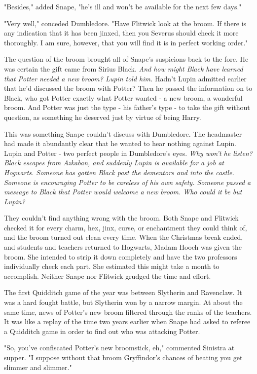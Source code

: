 \documentclass[a4paper,11pt]{article}
\begin{document}
"Besides," added Snape, "he's ill and won't be available for the next few days."

"Very well," conceded Dumbledore. "Have Flitwick look at the broom. If there is any indication that it has been jinxed, then you Severus should check it more thoroughly. I am sure, however, that you will find it is in perfect working order."

The question of the broom brought all of Snape's suspicions back to the fore. He was certain the gift came from Sirius Black. \emph{And how might Black have learned that Potter needed a new broom? Lupin told him.} Hadn't Lupin admitted earlier that he'd discussed the broom with Potter? Then he passed the information on to Black, who got Potter exactly what Potter wanted - a new broom, a wonderful broom. And Potter was just the type - his father's type - to take the gift without question, as something he deserved just by virtue of being Harry.

This was something Snape couldn't discuss with Dumbledore. The headmaster had made it abundantly clear that he wanted to hear nothing against Lupin. Lupin and Potter - two perfect people in Dumbledore's eyes. \emph{Why won't he listen? Black escapes from Azkaban, and suddenly Lupin is available for a job at Hogwarts. Someone has gotten Black past the dementors and into the castle. Someone is encouraging Potter to be careless of his own safety. Someone passed a message to Black that Potter would welcome a new broom. Who could it be but Lupin?}

They couldn't find anything wrong with the broom. Both Snape and Flitwick checked it for every charm, hex, jinx, curse, or enchantment they could think of, and the broom turned out clean every time. When the Christmas break ended, and students and teachers returned to Hogwarts, Madam Hooch was given the broom. She intended to strip it down completely and have the two professors individually check each part. She estimated this might take a month to accomplish. Neither Snape nor Flitwick grudged the time and effort.

The first Quidditch game of the year was between Slytherin and Ravenclaw. It was a hard fought battle, but Slytherin won by a narrow margin. At about the same time, news of Potter's new broom filtered through the ranks of the teachers. It was like a replay of the time two years earlier when Snape had asked to referee a Quidditch game in order to find out who was attacking Potter.

"So, you've confiscated Potter's new broomstick, eh," commented Sinistra at supper. "I suppose without that broom Gryffindor's chances of beating you get slimmer and slimmer."
\end{document}
